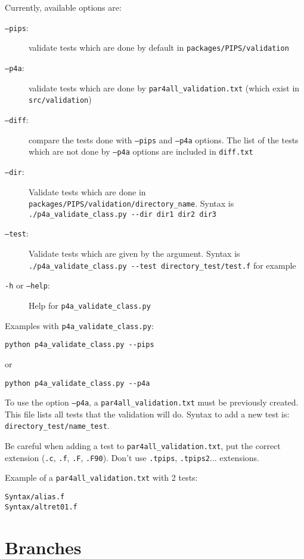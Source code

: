 \documentclass[a4paper]{article}
\begin{document}
Currently, available options are:
\begin{description}
\item[\texttt{--pips}:] validate tests which are done by default in
  \texttt{packages/PIPS/validation}

\item[\texttt{--p4a}:] validate tests which are done by
  \verb|par4all_validation.txt| (which exist in
  \texttt{src/validation})

\item[\texttt{--diff}:] compare the tests done with
  \texttt{--pips} and \texttt{--p4a} options. The list of the tests which
  are not done by \texttt{--p4a} options are included in \texttt{diff.txt}

\item[\texttt{--dir}:] Validate tests which are done in \verb|packages/PIPS/validation/directory_name|. Syntax is \verb|./p4a_validate_class.py --dir dir1 dir2 dir3|

\item[\texttt{--test}:] Validate tests which are given by the argument. Syntax is \verb|./p4a_validate_class.py --test directory_test/test.f| for example

\item[\texttt{-h} or \texttt{--help}:] Help for \verb|p4a_validate_class.py|
\end{description}

Examples with \verb|p4a_validate_class.py|:
\begin{verbatim}
python p4a_validate_class.py --pips
\end{verbatim}
or
\begin{verbatim}
python p4a_validate_class.py --p4a
\end{verbatim}

To use the option \texttt{--p4a}, a \verb|par4all_validation.txt| must be
previously created. This file lists all tests that the validation will do.
Syntax to add a new test is: \verb|directory_test/name_test|.

Be careful when adding a test to \verb|par4all_validation.txt|, put the
correct extension (\texttt{.c}, \texttt{.f}, \texttt{.F},
\texttt{.F90}). Don't use \texttt{.tpips}, \texttt{.tpips2}... extensions.

Example of a \verb|par4all_validation.txt| with 2 tests:
\begin{verbatim}
Syntax/alias.f
Syntax/altret01.f
\end{verbatim}


\section{Branches}
\label{sec:branches}
\end{document}
